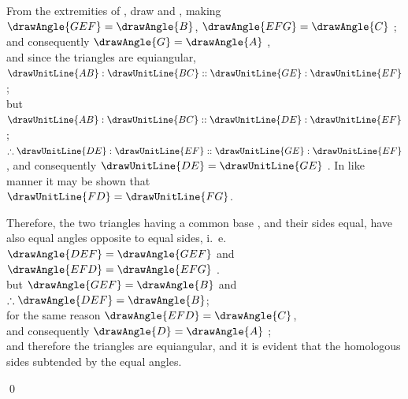 \documentclass[booklanguage=english]{byrnebook}
\begin{document}
\begin{center}
From the extremities of , draw  and , making\\
$\drawAngle{GEF} = \drawAngle{B}$, $\drawAngle{EFG} = \drawAngle{C}$ ;\\
and consequently $\drawAngle{G} = \drawAngle{A}$ ,\\
and since the triangles are equiangular,\\
$\drawUnitLine{AB} : \drawUnitLine{BC} :: \drawUnitLine{GE} : \drawUnitLine{EF}$ ;\\
but $\drawUnitLine{AB} : \drawUnitLine{BC} :: \drawUnitLine{DE} : \drawUnitLine{EF}$ \byref{\hypref};\\
$\therefore \drawUnitLine{DE} : \drawUnitLine{EF} :: \drawUnitLine{GE} : \drawUnitLine{EF}$,
and consequently $\drawUnitLine{DE} = \drawUnitLine{GE}$ .
In like manner it may be shown that\\
$\drawUnitLine{FD} = \drawUnitLine{FG}$.

Therefore, the two triangles having a common base , and their sides equal, have also equal angles opposite to equal sides, i.\ e.\\
$\drawAngle{DEF} = \drawAngle{GEF}$ and $\drawAngle{EFD} = \drawAngle{EFG}$ .\\
but $\drawAngle{GEF} = \drawAngle{B}$ \byref{\constref} and $\therefore \drawAngle{DEF} = \drawAngle{B}$;\\
for the same reason $\drawAngle{EFD} = \drawAngle{C}$,\\
and consequently $\drawAngle{D} = \drawAngle{A}$ ;\\
and therefore the triangles are equiangular, and it is evident that the homologous sides subtended by the equal angles.
\end{center}

\qed
\end{document}
